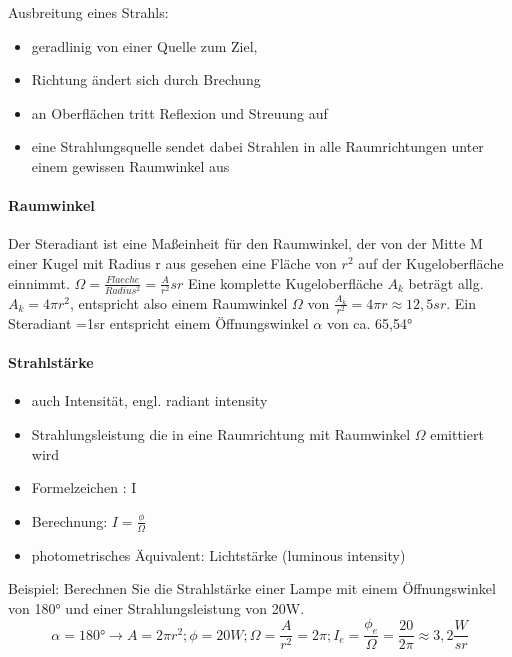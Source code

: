 \documentclass[10pt,landscape]{article}
\begin{document}
\begin{multicols}{3}
  Ausbreitung eines Strahls:
  \begin{itemize}
    \item geradlinig von einer Quelle zum Ziel,
    \item Richtung ändert sich durch Brechung
    \item an Oberflächen tritt Reflexion und Streuung auf
    \item eine Strahlungsquelle sendet dabei Strahlen in alle Raumrichtungen unter einem gewissen Raumwinkel aus
  \end{itemize}
  
  \paragraph{Raumwinkel}
  Der Steradiant ist eine Maßeinheit für den Raumwinkel, der von der Mitte M einer Kugel mit Radius r aus gesehen eine Fläche von $r^2$ auf der Kugeloberfläche einnimmt. $\Omega=\frac{Flaeche}{Radius^2}=\frac{A}{r^2}sr$
  Eine komplette Kugeloberfläche $A_k$ beträgt allg. $A_k = 4\pi r^2$, entspricht also einem Raumwinkel $\Omega$ von $\frac{A_k}{r^2}= 4\pi r\approx 12,5sr$. Ein Steradiant =1sr entspricht einem Öffnungswinkel $\alpha$ von ca. 65,54°
  
  \paragraph{Strahlstärke}
  \begin{itemize}
    \item auch Intensität, engl. radiant intensity
    \item Strahlungsleistung die in eine Raumrichtung mit Raumwinkel $\Omega$ emittiert wird
    \item Formelzeichen : I
    \item Berechnung: $I=\frac{\phi}{\Omega}$
    \item photometrisches Äquivalent: Lichtstärke (luminous intensity)
  \end{itemize}
  
  Beispiel: Berechnen Sie die Strahlstärke einer Lampe mit einem Öffnungswinkel von 180° und einer Strahlungsleistung von 20W.
  $$\alpha=180°\rightarrow A=2\pi r^2; \phi =20W; \Omega=\frac{A}{r^2}=2\pi ; I_e=\frac{\phi_e}{\Omega}=\frac{20}{2\pi}\approx 3,2 \frac{W}{sr}$$
  

\end{multicols}
\end{document}
